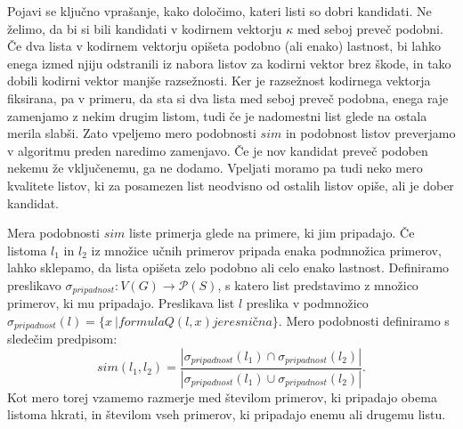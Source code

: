 \documentclass[12pt,a4paper]{article}
\begin{document}

Pojavi se ključno vprašanje, kako določimo, kateri listi so dobri kandidati. Ne želimo, da bi si bili kandidati v kodirnem vektorju $\kappa$ med seboj preveč podobni. 
Če dva lista v kodirnem vektorju opišeta podobno (ali enako) lastnost, bi lahko enega izmed njiju odstranili iz nabora listov za kodirni vektor brez škode, in tako dobili kodirni vektor manjše razsežnosti. 
Ker je razsežnost kodirnega vektorja fiksirana, pa v primeru, da sta si dva lista med seboj preveč podobna, enega raje zamenjamo z nekim drugim listom, tudi če je nadomestni list glede na ostala merila slabši.
Zato vpeljemo mero podobnosti $sim$ in podobnost listov preverjamo v algoritmu preden naredimo zamenjavo. Če je nov kandidat preveč podoben nekemu že vključenemu, ga ne dodamo.
Vpeljati moramo pa tudi neko mero kvalitete listov, ki za posamezen list neodvisno od ostalih listov opiše, ali je dober kandidat.

Mera podobnosti $sim$ liste primerja glede na primere, ki jim pripadajo. 
Če listoma $l_1$ in $l_2$ iz množice učnih primerov pripada enaka podmnožica primerov, lahko sklepamo, da lista opišeta zelo podobno ali celo enako lastnost.
Definiramo preslikavo $\sigma_{\mathit{pripadnost}}: V(G) \rightarrow \mathcal{P}(S)$, s katero list predstavimo z množico primerov, ki mu pripadajo.
Preslikava list $l$ preslika v podmnožico $\sigma_{\mathit{pripadnost}}(l) = \{x\ | formula Q(l,x) je resnična \}$.
Mero podobnosti definiramo s sledečim predpisom:
\[
	sim(l_1, l_2) = \frac{|\sigma_{pripadnost}(l_1) \cap \sigma_{pripadnost}(l_2)|}{|\sigma_{pripadnost}(l_1) \cup \sigma_{pripadnost}(l_2)|}.
\]
Kot mero torej vzamemo razmerje med številom primerov, ki pripadajo obema listoma hkrati, in številom vseh primerov, ki pripadajo enemu ali drugemu listu.
\end{document}
